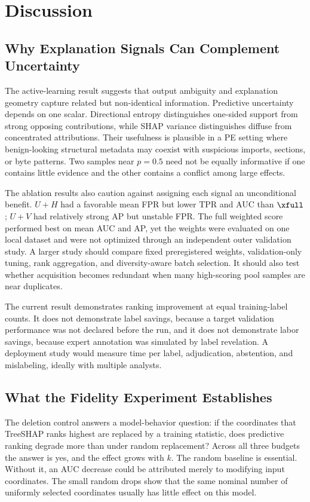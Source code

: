 \section{Discussion}
\label{sec:discussion}

\subsection{Why Explanation Signals Can Complement Uncertainty}

The active-learning result suggests that output ambiguity and explanation
geometry capture related but non-identical information. Predictive uncertainty
depends on one scalar. Directional entropy distinguishes one-sided support from
strong opposing contributions, while SHAP variance distinguishes diffuse from
concentrated attributions. Their usefulness is plausible in a PE setting where
benign-looking structural metadata may coexist with suspicious imports, sections,
or byte patterns. Two samples near $p=0.5$ need not be equally informative if one
contains little evidence and the other contains a conflict among large effects.

The ablation results also caution against assigning each signal an unconditional
benefit. $U+H$ had a favorable mean FPR but lower TPR and AUC than $\xfull$;
$U+V$ had relatively strong AP but unstable FPR. The full weighted score performed
best on mean AUC and AP, yet the weights were evaluated on one local dataset and
were not optimized through an independent outer validation study. A larger study
should compare fixed preregistered weights, validation-only tuning, rank
aggregation, and diversity-aware batch selection. It should also test whether
acquisition becomes redundant when many high-scoring pool samples are near
duplicates.

The current result demonstrates ranking improvement at equal training-label
counts. It does not demonstrate label savings, because a target validation
performance was not declared before the run, and it does not demonstrate labor
savings, because expert annotation was simulated by label revelation. A
deployment study would measure time per label, adjudication, abstention, and
mislabeling, ideally with multiple analysts.

\subsection{What the Fidelity Experiment Establishes}

The deletion control answers a model-behavior question: if the coordinates that
TreeSHAP ranks highest are replaced by a training statistic, does predictive
ranking degrade more than under random replacement? Across all three budgets the
answer is yes, and the effect grows with $k$. The random baseline is essential.
Without it, an AUC decrease could be attributed merely to modifying input
coordinates. The small random drops show that the same nominal number of
uniformly selected coordinates usually has little effect on this model.

